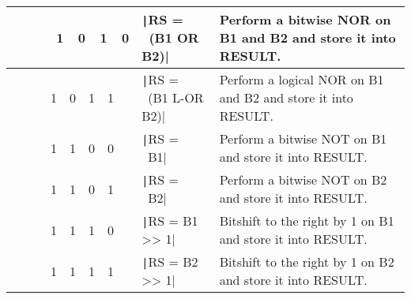 \documentclass[12pt,journal,compsoc]{article}
\begin{document}
\begin{center}
{\begin{tabular}{ | p{5.5cm} | p{5.0cm} | m{12.0cm} | }
  ~~~~~~1~~0~~1~~0 & \texttt|RS = ~(B1 OR B2)| & Perform a bitwise NOR on B1 and B2 and store it into RESULT. \\
  \hline
  ~~~~~~1~~0~~1~~1 & \texttt|RS = ~(B1 L-OR B2)| & Perform a logical NOR on B1 and B2 and store it into RESULT. \\
  \hline
  ~~~~~~1~~1~~0~~0 & \texttt|RS = ~B1| & Perform a bitwise NOT on B1 and store it into RESULT. \\
  \hline
  ~~~~~~1~~1~~0~~1 & \texttt|RS = ~B2| & Perform a bitwise NOT on B2 and store it into RESULT. \\
  \hline
  ~~~~~~1~~1~~1~~0 & \texttt|RS = B1 >> 1| & Bitshift to the right by 1 on B1 and store it into RESULT. \\
  \hline
  ~~~~~~1~~1~~1~~1 & \texttt|RS = B2 >> 1| & Bitshift to the right by 1 on B2 and store it into RESULT. \\
  \hline
\end{tabular} 
}

~~~~~~~~~~~~~


\end{center}
\end{document}
